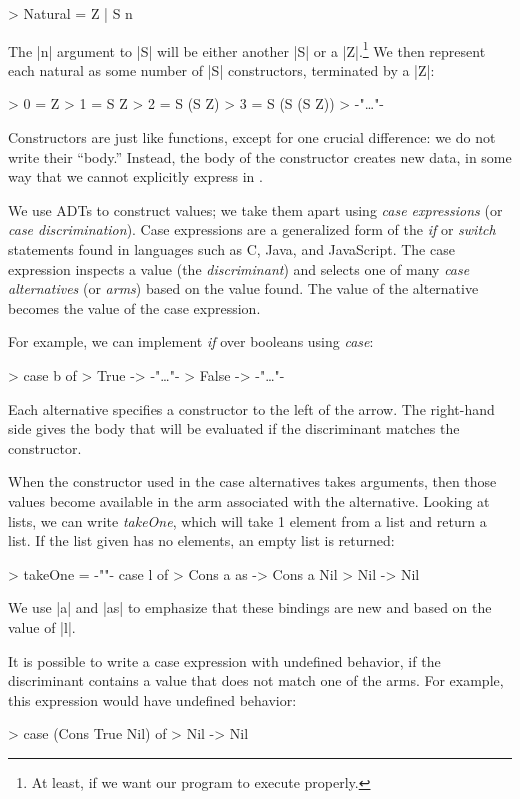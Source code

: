 \documentclass[12pt]{report}
\begin{document}
> Natural = Z | S n

The |n| argument to |S| will be either another |S| or a
|Z|.\footnote{At least, if we want our program to execute properly.} We
then represent each natural as some number of |S| constructors,
terminated by a |Z|:

> 0 = Z
> 1 = S Z
> 2 = S (S Z)
> 3 = S (S (S Z))
> {-"\ldots"-}

Constructors are just like functions, except for one crucial
difference: we do not write their ``body.'' Instead, the body of the
constructor creates new data, in some way that we cannot explicitly express
in \lamC. 

We use ADTs to construct values; we take them apart using \emph{case
  expressions} (or \emph{case discrimination}). Case expressions are a
generalized form of the \emph{if} or \emph{switch} statements found in
languages such as C, Java, and JavaScript. The case expression
inspects a value (the \emph{discriminant}) and selects one of many
\emph{case alternatives} (or \emph{arms}) based on the value
found. The value of the alternative becomes the value of the case
expression.

For example, we can implement \emph{if} over booleans using \emph{case}:

> case b of
>   True -> {-"\ldots"-}
>   False -> {-"\ldots"-}

Each alternative specifies a constructor to the left of the arrow. The
right-hand side gives the body that will be evaluated if the
discriminant matches the constructor. 

When the constructor used in the case alternatives takes arguments,
then those values become available in the arm associated with the
alternative.  Looking at lists, we can write \emph{takeOne}, which
will take 1 element from a list and return a list. If the list
given has no elements, an empty list is returned:

> takeOne = {-""-} case l of
>               Cons a as -> Cons a Nil
>               Nil -> Nil   

We use |a| and |as| to emphasize that these bindings are new and based on
the value of |l|.

It is possible to write a case expression with undefined behavior, if
the discriminant contains a value that does not match one of the arms. For
example, this expression would have undefined behavior:

> case (Cons True Nil) of
>   Nil -> Nil
\end{document}
